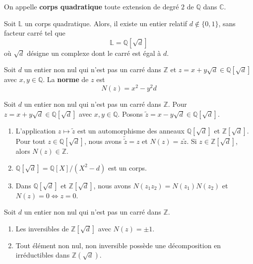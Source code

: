 	\begin{definition}
		On appelle \textbf{corps quadratique} toute extension de degré $2$ de $\mathbb{Q}$ dans $\mathbb{C}$.
	\end{definition}

	\begin{theorem}
		Soit $\mathbb{L}$ un corps quadratique. Alors, il existe un entier relatif $d \notin \{ 0, 1 \}$, sans facteur carré tel que
		\[ \mathbb{L} = \mathbb{Q}[\sqrt{d}] \]
		où $\sqrt{d}$ désigne un complexe dont le carré est égal à $d$.
	\end{theorem}


	\begin{definition}
		Soit $d$ un entier non nul qui n'est pas un carré dans $\mathbb{Z}$ et $z = x+y\sqrt{d} \in \mathbb{Q}[\sqrt{d}]$ avec $x, y \in \mathbb{Q}$. La \textbf{norme} de $z$ est
		\[ N(z) = x^2-y^2d \]
	\end{definition}

	\begin{proposition}
		Soit $d$ un entier non nul qui n'est pas un carré dans $\mathbb{Z}$. Pour $z = x+y\sqrt{d} \in \mathbb{Q}[\sqrt{d}]$ avec $x,y \in \mathbb{Q}$. Posons $\widetilde{z} = x-y\sqrt{d} \in \mathbb{Q}[\sqrt{d}]$.
		\begin{enumerate}[label=(\roman*)]
			\item L'application $z \mapsto \widetilde{z}$ est un automorphisme des anneaux $\mathbb{Q}[\sqrt{d}]$ et $\mathbb{Z}[\sqrt{d}]$. Pour tout $z \in \mathbb{Q}[\sqrt{d}]$, nous avons $\widetilde{\widetilde{z}} = z$ et $N(z) = z \widetilde{z}$. Si $z \in \mathbb{Z}[\sqrt{d}]$, alors $N(z) \in \mathbb{Z}$.
			\item $\mathbb{Q}[\sqrt{d}] = \mathbb{Q}[X]/(X^2 - d)$ est un corps.
			\item Dans $\mathbb{Q}[\sqrt{d}]$ et $\mathbb{Z}[\sqrt{d}]$, nous avons $N(z_1 z_2) = N(z_1) N(z_2)$ et $N(z) = 0 \iff z = 0$.
		\end{enumerate}
	\end{proposition}

	\begin{proposition}
		Soit $d$ un entier non nul qui n'est pas un carré dans $\mathbb{Z}$.
		\begin{enumerate}[label=(\roman*)]
			\item Les inversibles de $\mathbb{Z}[\sqrt{d}]$ avec $N(z) = \pm 1$.
			\item Tout élément non nul, non inversible possède une décomposition en irréductibles dans $\mathbb{Z}(\sqrt{d})$.
		\end{enumerate}
	\end{proposition}

